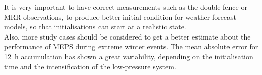 It is very important to have correct measurements such as the double fence or MRR observations, to produce better initial condition for weather forecast models, so that initialisations can start at a realistic state.
\\
Also, more study cases should be considered to get a better estimate about the performance of MEPS during extreme winter events. The mean absolute error for \SI{12}{\hour} accumulation has shown a great variability, depending on the initialisation time and the intensification of the low-pressure system.  




